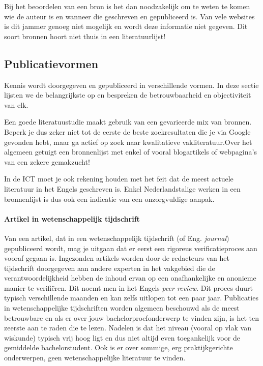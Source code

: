Bij het beoordelen van een bron is het dan noodzakelijk om te weten te komen wie de auteur is en wanneer die geschreven en gepubliceerd is. Van vele websites is dit jammer genoeg niet mogelijk en wordt deze informatie niet gegeven. Dit soort bronnen hoort niet thuis in een literatuurlijst!

\subsection{Publicatievormen}%
\label{sub:publicatievormen}

Kennis wordt doorgegeven en gepubliceerd in verschillende vormen. In deze sectie lijsten we de belangrijkste op en bespreken de betrouwbaarheid en objectiviteit van elk.

Een goede literatuustudie maakt gebruik van een gevarieerde mix van bronnen. Beperk je dus zeker niet tot de eerste de beste zoekresultaten die je via Google gevonden hebt, maar ga actief op zoek naar kwalitatieve vakliteratuur.Over het algemeen getuigt een bronnenlijst met enkel of vooral blogartikels of webpagina's van een zekere gemakzucht!

In de ICT moet je ook rekening houden met het feit dat de meest actuele literatuur in het Engels geschreven is. Enkel Nederlandstalige werken in een bronnenlijst is dus ook een indicatie van een onzorgvuldige aanpak.

\paragraph{Artikel in wetenschappelijk tijdschrift}

Van een artikel, dat in een wetenschappelijk tijdschrift (of Eng. \emph{journal}) gepubliceerd wordt, mag je uitgaan dat er eerst een rigoreus verificatieproces aan vooraf gegaan is. Ingezonden artikels worden door de redacteurs van het tijdschrift doorgegeven aan andere experten in het vakgebied die de verantwoordelijkheid hebben de inhoud ervan op een onafhankelijke en anonieme manier te verifiëren. Dit noemt men in het Engels \emph{peer review}. Dit proces duurt typisch verschillende maanden en kan zelfs uitlopen tot een paar jaar. Publicaties in wetenschappelijke tijdschriften worden algemeen beschouwd als de meest betrouwbare en als er over jouw bachelorproefonderwerp te vinden zijn, is het ten zeerste aan te raden die te lezen. Nadelen is dat het niveau (vooral op vlak van wiskunde) typisch vrij hoog ligt en dus niet altijd even toegankelijk voor de gemiddelde bachelorstudent. Ook is er over sommige, erg praktijkgerichte onderwerpen, geen wetenschappelijke literatuur te vinden.

